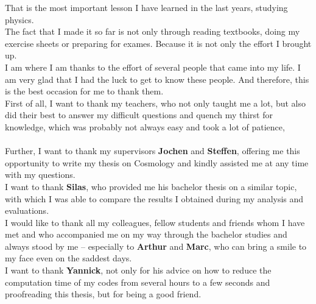 \noindent That is the most important lesson I have learned in the last years, studying physics. \\ 

\noindent The fact that I made it so far is not only through reading textbooks, doing my exercise sheets or preparing for exames. Because it is not only the effort I brought up. \\
I am where I am thanks to the effort of several people that came into my life. I am very glad that I had the luck to get to know these people. And therefore, this is the best occasion for me to thank them. \\

\noindent First of all, I want to thank my teachers, who not only taught me a lot, but also did their best to answer my difficult questions and quench my thirst for knowledge, which was probably not always easy and took a lot of patience, \\

 \\

\noindent Further, I want to thank my supervisors \textbf{Jochen} and \textbf{Steffen}, offering me this opportunity to write my thesis on Cosmology and kindly assisted me at any time with my questions. \\

\noindent I want to thank \textbf{Silas}, who provided me his bachelor thesis on a similar topic, with which I was able to compare the results I obtained during my analysis and evaluations. \\

\noindent I would like to thank all my colleagues, fellow students and friends whom I have met and who accompanied me on my way through the bachelor studies and always stood by me -- especially to \textbf{Arthur} and \textbf{Marc}, who can bring a smile to my face even on the saddest days. \\

\noindent I want to thank \textbf{Yannick}, not only for his advice on how to reduce the computation time of my codes from several hours to a few seconds and proofreading this thesis, but for being a good friend. \\

